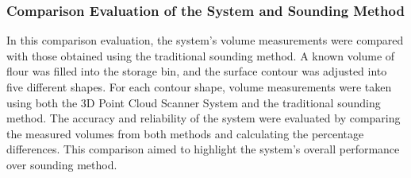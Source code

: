 \subsubsection{Comparison Evaluation of the System and Sounding Method}
In this comparison evaluation, the system's volume measurements were compared with those obtained using the traditional sounding method. A known volume of flour was filled into the storage bin, and the surface contour was adjusted into five different shapes. For each contour shape, volume measurements were taken using both the 3D Point Cloud Scanner System and the traditional sounding method. The accuracy and reliability of the system were evaluated by comparing the measured volumes from both methods and calculating the percentage differences. This comparison aimed to highlight the system's overall performance over sounding method.



